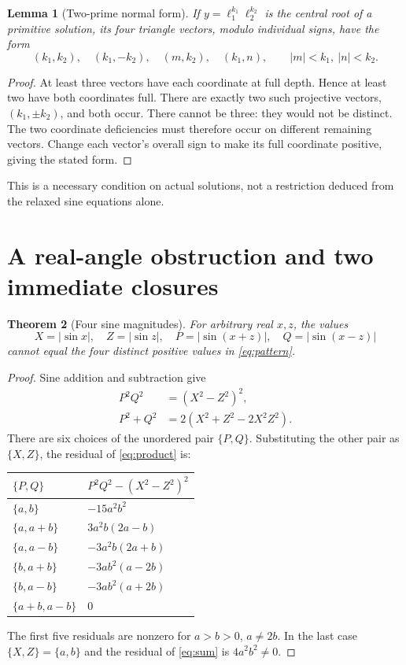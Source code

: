 \documentclass[11pt,letterpaper]{article}
\newtheorem{theorem}{Theorem}[section]
\newtheorem{lemma}[theorem]{Lemma}
\theoremstyle{definition}\newtheorem{definition}[theorem]{Definition}
\theoremstyle{remark}\newtheorem{remark}[theorem]{Remark}
\begin{document}
\begin{lemma}[Two-prime normal form]\label{lem:two}
If $y=\ell_1^{k_1}\ell_2^{k_2}$ is the central root of a primitive solution, its four triangle vectors, modulo individual signs, have the form
\[
(k_1,k_2),\quad(k_1,-k_2),\quad(m,k_2),\quad(k_1,n),
\qquad |m|<k_1,\ |n|<k_2.
\]
\end{lemma}
\begin{proof}
At least three vectors have each coordinate at full depth. Hence at least two have both coordinates full. There are exactly two such projective vectors, $(k_1,\pm k_2)$, and both occur. There cannot be three: they would not be distinct. The two coordinate deficiencies must therefore occur on different remaining vectors. Change each vector's overall sign to make its full coordinate positive, giving the stated form.
\end{proof}
This is a necessary condition on actual solutions, not a restriction deduced from the relaxed sine equations alone.

\section{A real-angle obstruction and two immediate closures}\label{sec:real}
\begin{theorem}[Four sine magnitudes]\label{thm:real}
For arbitrary real $x,z$, the values
\[
X=|\sin x|,\quad Z=|\sin z|,\quad
P=|\sin(x+z)|,\quad Q=|\sin(x-z)|
\]
cannot equal the four distinct positive values in \eqref{eq:pattern}.
\end{theorem}
\begin{proof}
Sine addition and subtraction give
\begin{align}
P^2Q^2&=(X^2-Z^2)^2,\label{eq:product}\\
P^2+Q^2&=2(X^2+Z^2-2X^2Z^2).\label{eq:sum}
\end{align}
There are six choices of the unordered pair $\{P,Q\}$. Substituting the other pair as $\{X,Z\}$, the residual of \eqref{eq:product} is:
\begin{center}
\begin{tabular}{ll}
\toprule
$\{P,Q\}$ & $P^2Q^2-(X^2-Z^2)^2$\\
\midrule
$\{a,b\}$ & $-15a^2b^2$\\
$\{a,a+b\}$ & $3a^2b(2a-b)$\\
$\{a,a-b\}$ & $-3a^2b(2a+b)$\\
$\{b,a+b\}$ & $-3ab^2(a-2b)$\\
$\{b,a-b\}$ & $-3ab^2(a+2b)$\\
$\{a+b,a-b\}$ & $0$\\
\bottomrule
\end{tabular}
\end{center}
The first five residuals are nonzero for $a>b>0$, $a\ne2b$. In the last case $\{X,Z\}=\{a,b\}$ and the residual of \eqref{eq:sum} is $4a^2b^2\ne0$.
\end{proof}
\end{document}
